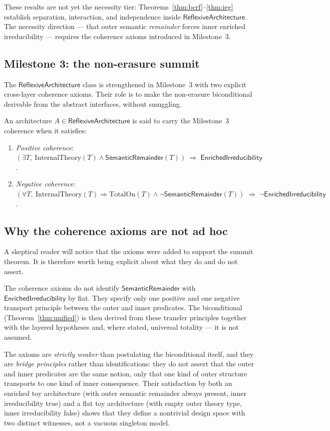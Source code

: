 \documentclass[11pt]{article}
\newcommand{\SemRem}{\ensuremath{\mathsf{SemanticRemainder}}}
\newcommand{\RAL}{\ensuremath{\mathsf{ReflexiveArchitecture}}}
\newcommand{\EnrIrr}{\ensuremath{\mathsf{EnrichedIrreducibility}}}
\begin{document}
These results are not yet the necessity tier: Theorems~\ref{thm:bcrf}--\ref{thm:ieg}
establish separation, interaction, and independence inside $\RAL$.  The necessity
direction --- that outer semantic \emph{remainder} forces inner enriched irreducibility
--- requires the coherence axioms introduced in Milestone~3.

\subsection{Milestone 3: the non-erasure summit}

The $\RAL$ class is strengthened in Milestone~3 with two explicit cross-layer coherence
axioms.  Their role is to make the non-erasure biconditional derivable from the abstract
interfaces, without smuggling.

\begin{definition}
\label{def:coherence}
An architecture $A \in \RAL$ is said to carry the Milestone~3 coherence when it
satisfies:
\begin{enumerate}[label=(\roman*), leftmargin=2em]
\item \emph{Positive coherence}: $(\exists T,\ \mathrm{InternalTheory}(T) \wedge
\SemRem(T)) \;\Rightarrow\; \EnrIrr$.
\item \emph{Negative coherence}: $(\forall T,\ \mathrm{InternalTheory}(T) \Rightarrow
\mathrm{TotalOn}(T) \wedge \neg\SemRem(T)) \;\Rightarrow\; \neg\EnrIrr$.
\end{enumerate}
\end{definition}

\subsection{Why the coherence axioms are not ad hoc}
\label{sec:coherence-not-adhoc}

A skeptical reader will notice that the axioms were added to support the summit theorem.
It is therefore worth being explicit about what they do and do not assert.

The coherence axioms do not identify $\SemRem$ with $\EnrIrr$ by fiat.  They specify
only one positive and one negative transport principle between the outer and inner
predicates.  The biconditional (Theorem~\ref{thm:unified}) is then derived from these
transfer principles together with the layered hypotheses and, where stated, universal
totality --- it is not assumed.

The axioms are \emph{strictly weaker} than postulating the biconditional itself, and
they are \emph{bridge principles} rather than identifications: they do not assert that
the outer and inner predicates are the same notion, only that one kind of outer structure
transports to one kind of inner consequence.  Their satisfaction by both an enriched toy
architecture (with outer semantic remainder always present, inner irreducibility true) and
a flat toy architecture (with empty outer theory type, inner irreducibility false) shows
that they define a nontrivial design space with two distinct witnesses, not a vacuous
singleton model.
\end{document}
